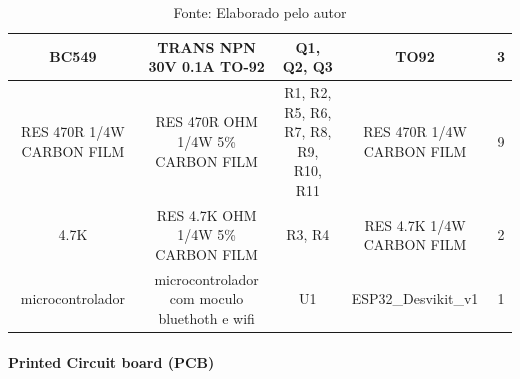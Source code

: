 \documentclass[../delivery_hospital_report.tex]{subfiles}
\begin{document}
\begin{table}[]
\begin{adjustbox}{width=\columnwidth,center}
\begin{tabular}{|c|c|c|c|c|}
BC549                       & TRANS NPN 30V 0.1A   TO-92                     & Q1, Q2, Q3                             & TO92                        & 3        \\ \hline
RES 470R 1/4W   CARBON FILM & RES 470R OHM 1/4W 5\%   CARBON FILM            & R1, R2, R5, R6, R7,   R8, R9, R10, R11 & RES 470R 1/4W CARBON   FILM & 9        \\ \hline
4.7K                        & RES 4.7K OHM 1/4W 5\%   CARBON FILM            & R3, R4                                 & RES 4.7K 1/4W CARBON   FILM & 2        \\ \hline
microcontrolador            & microcontrolador com   moculo bluethoth e wifi & U1                                     & ESP32\_Desvikit\_v1         & 1        \\ \hline

\end{tabular}
\end{adjustbox}
\centering
\caption*{Fonte: Elaborado pelo autor}
\label{table:voc}
\end{table}


\paragraph{Printed Circuit board (PCB)}
\end{document}
